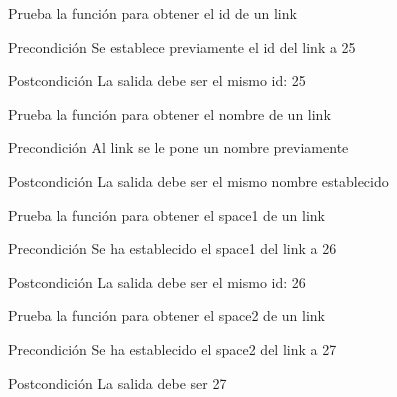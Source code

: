 \begin{DoxyRefList}
\item[\label{test__test000146}%
\hypertarget{test__test000146}{}%
Global \hyperlink{link__test_8c_a19c70f79fd51d123173f7aaf6ae50bf8}{test1\-\_\-link\-\_\-get\-\_\-id} ()]Prueba la función para obtener el id de un link \begin{DoxyPrecond}{Precondición}
Se establece previamente el id del link a 25 
\end{DoxyPrecond}
\begin{DoxyPostcond}{Postcondición}
La salida debe ser el mismo id\-: 25  
\end{DoxyPostcond}

\item[\label{test__test000144}%
\hypertarget{test__test000144}{}%
Global \hyperlink{link__test_8c_a044128db00a5cc385d7157dea8bdf3c3}{test1\-\_\-link\-\_\-get\-\_\-name} ()]Prueba la función para obtener el nombre de un link \begin{DoxyPrecond}{Precondición}
Al link se le pone un nombre previamente 
\end{DoxyPrecond}
\begin{DoxyPostcond}{Postcondición}
La salida debe ser el mismo nombre establecido  
\end{DoxyPostcond}

\item[\label{test__test000148}%
\hypertarget{test__test000148}{}%
Global \hyperlink{link__test_8c_a51cdc27e82c1bac69bdf8702ead4d3d5}{test1\-\_\-link\-\_\-get\-\_\-space1} ()]Prueba la función para obtener el space1 de un link \begin{DoxyPrecond}{Precondición}
Se ha establecido el space1 del link a 26 
\end{DoxyPrecond}
\begin{DoxyPostcond}{Postcondición}
La salida debe ser el mismo id\-: 26  
\end{DoxyPostcond}

\item[\label{test__test000150}%
\hypertarget{test__test000150}{}%
Global \hyperlink{link__test_8c_ae52422914337fe824858963bf1bb9638}{test1\-\_\-link\-\_\-get\-\_\-space2} ()]Prueba la función para obtener el space2 de un link \begin{DoxyPrecond}{Precondición}
Se ha establecido el space2 del link a 27 
\end{DoxyPrecond}
\begin{DoxyPostcond}{Postcondición}
La salida debe ser 27  
\end{DoxyPostcond}


\end{DoxyRefList}
